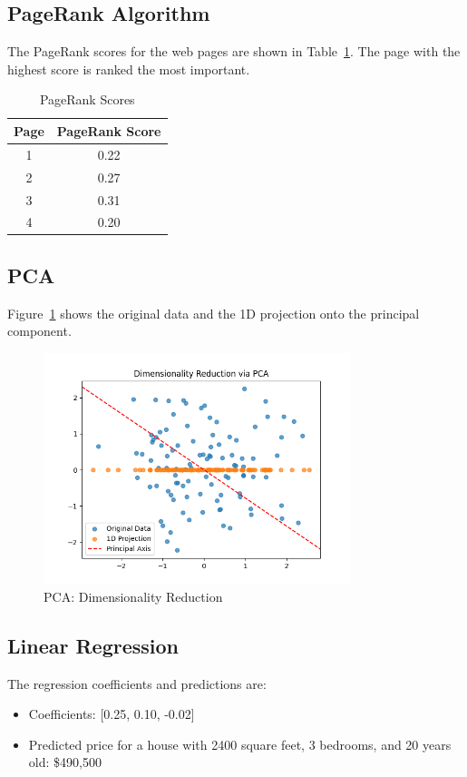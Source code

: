 \documentclass[a4paper,12pt]{article}
\begin{document}
\subsection{PageRank Algorithm}
The PageRank scores for the web pages are shown in Table~\ref{table:pagerank}. The page with the highest score is ranked the most important.

\begin{table}[h!]
\centering
\begin{tabular}{|c|c|}
\hline
Page & PageRank Score \\ \hline
1    & 0.22           \\ \hline
2    & 0.27           \\ \hline
3    & 0.31           \\ \hline
4    & 0.20           \\ \hline
\end{tabular}
\caption{PageRank Scores}
\label{table:pagerank}
\end{table}

\subsection{PCA}
Figure~\ref{fig:pca} shows the original data and the 1D projection onto the principal component.

\begin{figure}[h!]
\centering
\includegraphics[width=0.8\textwidth]{results/pca_plot.png}
\caption{PCA: Dimensionality Reduction}
\label{fig:pca}
\end{figure}

\subsection{Linear Regression}
The regression coefficients and predictions are:
\begin{itemize}
    \item Coefficients: [0.25, 0.10, -0.02]
    \item Predicted price for a house with 2400 square feet, 3 bedrooms, and 20 years old: \$490,500
\end{itemize}
\end{document}
